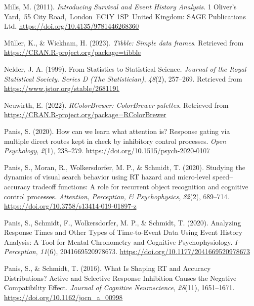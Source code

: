 \documentclass[
  man, donotrepeattitle,floatsintext]{apa6}
\newlength{\cslhangindent}
\newenvironment{CSLReferences}[2] %
 {\begin{list}{}{%
  \setlength{\itemindent}{0pt}
  \setlength{\leftmargin}{0pt}
  \setlength{\parsep}{0pt}
  \ifodd #1
   \setlength{\leftmargin}{\cslhangindent}
   \setlength{\itemindent}{-1\cslhangindent}
  \fi
  \setlength{\itemsep}{#2\baselineskip}}}
 {\end{list}}
\begin{document}
\begin{CSLReferences}{1}{0}
Mills, M. (2011). \emph{Introducing {Survival} and {Event History Analysis}}. 1 Oliver's Yard,~55 City Road,~London~EC1Y 1SP~United Kingdom: SAGE Publications Ltd. \url{https://doi.org/10.4135/9781446268360}

Müller, K., \& Wickham, H. (2023). \emph{Tibble: Simple data frames}. Retrieved from \url{https://CRAN.R-project.org/package=tibble}

Nelder, J. A. (1999). From {Statistics} to {Statistical Science}. \emph{Journal of the Royal Statistical Society. Series D (The Statistician)}, \emph{48}(2), 257--269. Retrieved from \url{https://www.jstor.org/stable/2681191}

Neuwirth, E. (2022). \emph{RColorBrewer: ColorBrewer palettes}. Retrieved from \url{https://CRAN.R-project.org/package=RColorBrewer}

Panis, S. (2020). How can we learn what attention is? {Response} gating via multiple direct routes kept in check by inhibitory control processes. \emph{Open Psychology}, \emph{2}(1), 238--279. \url{https://doi.org/10.1515/psych-2020-0107}

Panis, S., Moran, R., Wolkersdorfer, M. P., \& Schmidt, T. (2020). Studying the dynamics of visual search behavior using {RT} hazard and micro-level speed--accuracy tradeoff functions: {A} role for recurrent object recognition and cognitive control processes. \emph{Attention, Perception, \& Psychophysics}, \emph{82}(2), 689--714. \url{https://doi.org/10.3758/s13414-019-01897-z}

Panis, S., Schmidt, F., Wolkersdorfer, M. P., \& Schmidt, T. (2020). Analyzing {Response Times} and {Other Types} of {Time-to-Event Data Using Event History Analysis}: {A Tool} for {Mental Chronometry} and {Cognitive Psychophysiology}. \emph{I-Perception}, \emph{11}(6), 2041669520978673. \url{https://doi.org/10.1177/2041669520978673}

Panis, S., \& Schmidt, T. (2016). What {Is Shaping RT} and {Accuracy Distributions}? {Active} and {Selective Response Inhibition Causes} the {Negative Compatibility Effect}. \emph{Journal of Cognitive Neuroscience}, \emph{28}(11), 1651--1671. \url{https://doi.org/10.1162/jocn_a_00998}


\end{CSLReferences}
\end{document}
